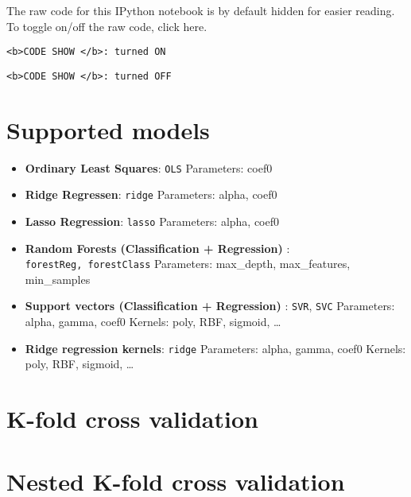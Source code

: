 \documentclass[11pt]{article}
\providecommand{\tightlist}{%
      \setlength{\itemsep}{0pt}\setlength{\parskip}{0pt}}
\begin{document}
The raw code for this IPython notebook is by default hidden for easier
reading. To toggle on/off the raw code, click here.

\begin{verbatim}
<b>CODE SHOW </b>: turned ON
\end{verbatim}

\begin{verbatim}
<b>CODE SHOW </b>: turned OFF
\end{verbatim}

    \section{Supported models}\label{supported-models}

\begin{itemize}
\tightlist
\item
  \textbf{Ordinary Least Squares}: \texttt{OLS} Parameters: coef0
\item
  \textbf{Ridge Regressen}: \texttt{ridge} Parameters: alpha, coef0
\item
  \textbf{Lasso Regression}: \texttt{lasso} Parameters: alpha, coef0
\item
  \textbf{Random Forests (Classification + Regression)} :
  \texttt{forestReg,\ forestClass} Parameters: max\_depth,
  max\_features, min\_samples
\item
  \textbf{Support vectors (Classification + Regression) }: \texttt{SVR},
  \texttt{SVC} Parameters: alpha, gamma, coef0 Kernels: poly, RBF,
  sigmoid, \ldots{}
\item
  \textbf{Ridge regression kernels}: \texttt{ridge} Parameters: alpha,
  gamma, coef0 Kernels: poly, RBF, sigmoid, \ldots{}
\end{itemize}

    \section{K-fold cross validation}\label{k-fold-cross-validation}

    \section{Nested K-fold cross
validation}\label{nested-k-fold-cross-validation}
\end{document}
